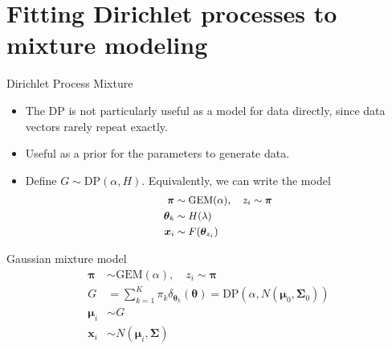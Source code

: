 \documentclass[10pt,mathserif]{beamer}
\begin{document}
\section{Fitting Dirichlet processes to mixture modeling}
\begin{frame}{Dirichlet Process Mixture}
\begin{figure}[h]
\centering
{}
\end{figure}
\begin{itemize}
    \item The DP is not particularly useful as a model for data directly, since data vectors rarely repeat exactly.
    \item Useful as a prior for the parameters to generate data.
    \item Define $G \sim \text{DP}(\alpha,H)$. Equivalently, we can write the model
    \begin{equation*}\small
        \begin{split}
            \bm{\pi} & \sim \text{GEM}(\alpha), \quad
            z_i \sim  \bm{\pi}\\
            \bm{\theta}_k & \sim H(\lambda)\\
            \bm{x}_i & \sim F(\bm{\theta}_{z_i})
        \end{split}    
    \end{equation*}

\end{itemize}    
\end{frame}

\begin{frame}{Gaussian mixture model}
\begin{equation*}
    \begin{split}
        \bm{\pi} & \sim \text{GEM}(\alpha), \quad
            z_i \sim  \bm{\pi}\\
        G & = \sum_{k=1}^K \pi_k\delta_{\bm{\theta}_k} (\bm{\theta}) = \text{DP}(\alpha,N(\bm{\mu}_0,\bm{\Sigma}_0))\\
        \bm{\mu}_i & \sim G\\
        \bm{x}_i & \sim N(\bm{\mu}_i,\bm{\Sigma})
    \end{split}        
\end{equation*}
    
\end{frame}
\end{document}
